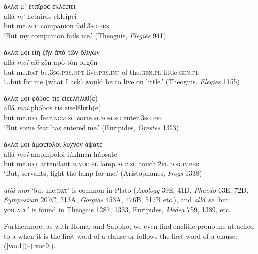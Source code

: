 \begin{exe}
\ex ἀλλά μ᾽ ἑταῖροϲ ἐκλείπει\\
\gll allá \emph{m'} hetaîros ekleípei\\
but me.\textsc{acc} companion fail.\textsc{3sg.prs}\\
\trans `But my companion fails me.' (Theognis, \textit{Elegies} 941)
\label{alla4}
\end{exe}

\begin{exe}
\ex ἀλλά μοι εἴη ζῆν ἀπὸ τῶν ὀλίγων\\
\gll allá \emph{moi} eíē zên apò tôn olígōn\\
but me.\textsc{dat} be.\textsc{3sg.prs.opt} live.\textsc{prs.inf} of
the.\textsc{gen.pl} little.\textsc{gen.pl}\\
\trans `...but for me (what I ask) would be to live on little.' (Theognis, \textit{Elegies} 1155)
\label{alla5}
\end{exe}

\begin{exe}
\ex ἀλλά μοι φόβοϲ τιϲ εἰϲελήλυθ(ε)\\
\gll allá \emph{moi} phóbos tis eiselḗluth(e)\\
but me.\textsc{dat} fear.\textsc{nom.sg} some.\textsc{m.nom.sg} enter.\textsc{3sg.prf}\\
\trans `But some fear has entered me.' (Euripides, \textit{Orestes} 1323)
\label{alla6}
\end{exe}

\begin{exe}
\ex ἀλλά μοι ἀμφίπολοι λύχνον ἅψατε\\
\gll allá \emph{moi} amphípoloi lúkhnon hápsate\\
but me.\textsc{dat} attendant.\textsc{m.voc.pl} lamp.\textsc{acc.sg}
touch.\textsc{2pl.aor.imper}\\
\trans `But, servants, light the lamp for me.' (Aristophanes, \textit{Frogs} 1338)\\
\label{alla7}
\end{exe}

\emph{allá moi} `but me.\textsc{dat}' is common in Plato (\textit{Apology} 39E, 41D, \textit{Phaedo} 63E, 72D, \textit{Symposium} 207C, 213A, \textit{Gorgias} 453A, 476B, 517B etc.), and \emph{allá se} `but you.\textsc{acc}' is found in Theognis 1287, 1333, Euripides, \textit{Medea} 759, 1389, etc.

Furthermore, as with Homer and Sappho, we even find enclitic pronouns attached to a  when it is the first word of a clause or follows the first word of a clause: (\ref{voc1})--(\ref{voc9}).

